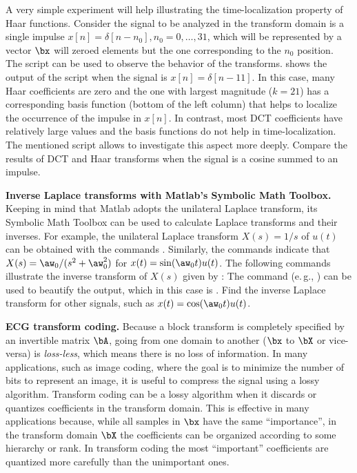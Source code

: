 A very simple experiment will help illustrating the time-localization property of Haar functions. Consider the signal to be analyzed in the transform domain is a single impulse $x[n]=\delta[n-n_0],n_0=0,\ldots,31$, which will be represented by a vector $\bx$ will zeroed elements but the one corresponding to the $n_0$ position. The script  can be used to observe the behavior of the transforms.  shows the output of the script when the signal is $x[n]=\delta[n-11]$. In this case, many Haar coefficients are zero and the one with largest magnitude ($k=21$) has a corresponding basis function (bottom of the left column) that helps to localize the occurrence of the impulse in $x[n]$. In contrast, most DCT coefficients have relatively large values and the basis functions do not help in time-localization. The mentioned script allows to investigate this aspect more deeply.
Compare the results of DCT and Haar transforms when the signal is a cosine summed to an impulse.
\eApplication 

\bApplication \textbf{Inverse Laplace transforms with Matlab's Symbolic Math Toolbox.}
Keeping in mind that Matlab adopts the unilateral Laplace transform, its Symbolic Math Toolbox can be used to calculate Laplace transforms and their inverses. For example, the unilateral Laplace transform $X(s)=1/s$ of $u(t)$ can be obtained with the commands . Similarly, the commands  indicate that $X(s) = \aw_0/(s^2 + \aw_0^2)$ for $x(t) = \sin (\aw_0 t) u(t)$.
The following commands illustrate the inverse transform of $X(s)$ given by :
The command  (e.\,g., ) can be used to beautify the output, which in this case is .
Find the inverse Laplace transform for other signals, such as $x(t) = \cos (\aw_0 t) u(t)$.
\eApplication

\bApplication \textbf{ECG transform coding.}
\label{app:ecgcoding}
Because a block transform is completely specified by an invertible matrix $\bA$, going from one domain to another ($\bx$ to $\bX$ or vice-versa) is \emph{loss-less}, which means there is no loss of information. In many applications, such as image coding, where the goal is to minimize the number of bits to represent an image, it is useful to compress the signal using a lossy algorithm. Transform coding can be a lossy algorithm when it discards or quantizes coefficients in the transform domain. This is effective in many applications because, while all samples in $\bx$ have the same ``importance'', in the transform domain $\bX$ the coefficients can be organized according to some hierarchy or rank. In transform coding the most ``important'' coefficients are quantized more carefully than the unimportant ones.

